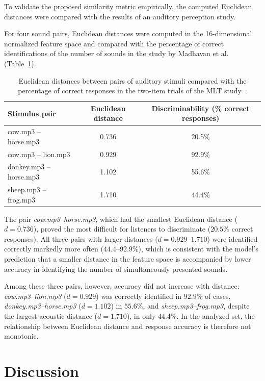 \documentclass{article}
\begin{document}
To validate the proposed similarity metric empirically, the computed Euclidean distances were compared with the results of an auditory perception study.

For four sound pairs, Euclidean distances were computed in the 16-dimensional normalized feature space and compared with the percentage of correct identifications of the number of sounds in the study by Madhavan et al.~\cite{MadhavanWrobel2024MLT} (Table~\ref{tab:mlt_walidacja}).

\begin{table}[H]
\centering
\begin{tabular}{lcc}
\toprule
Stimulus pair & Euclidean distance & Discriminability (\% correct responses) \\
\midrule
cow.mp3 -- horse.mp3     & 0.736 & 20.5\% \\
cow.mp3 -- lion.mp3    & 0.929 & 92.9\% \\
donkey.mp3 -- horse.mp3   & 1.102 & 55.6\% \\
sheep.mp3 -- frog.mp3  & 1.710 & 44.4\% \\
\bottomrule
\end{tabular}
\caption{Euclidean distances between pairs of auditory stimuli compared with the percentage of correct responses in the two-item trials of the MLT study~\cite{MadhavanWrobel2024MLT}.}
\label{tab:mlt_walidacja}
\end{table}

The pair \textit{cow.mp3--horse.mp3}, which had the smallest Euclidean distance ($d = 0.736$), proved the most difficult for listeners to discriminate ($20.5\%$ correct responses). All three pairs with larger distances ($d = 0.929$--$1.710$) were identified correctly markedly more often ($44.4$--$92.9\%$), which is consistent with the model's prediction that a smaller distance in the feature space is accompanied by lower accuracy in identifying the number of simultaneously presented sounds.

Among these three pairs, however, accuracy did not increase with distance: \textit{cow.mp3--lion.mp3} ($d = 0.929$) was correctly identified in $92.9\%$ of cases, \textit{donkey.mp3--horse.mp3} ($d = 1.102$) in $55.6\%$, and \textit{sheep.mp3--frog.mp3}, despite the largest acoustic distance ($d = 1.710$), in only $44.4\%$. In the analyzed set, the relationship between Euclidean distance and response accuracy is therefore not monotonic.



\section{Discussion}
\end{document}
